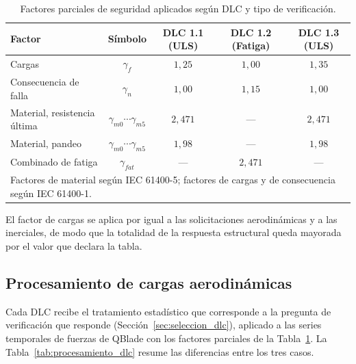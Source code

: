 \begin{table}[H]
    \centering
    \caption{Factores parciales de seguridad aplicados según DLC y tipo de verificación.}
    \label{tab:factores_seguridad}
    \begin{tabular}{lcccc}
        \hline
        \textbf{Factor} & \textbf{Símbolo} & \textbf{DLC 1.1 (ULS)} & \textbf{DLC 1.2 (Fatiga)} & \textbf{DLC 1.3 (ULS)} \\
        \hline
        Cargas & $\gamma_f$ & $1{,}25$ & $1{,}00$ & $1{,}35$ \\
        Consecuencia de falla & $\gamma_n$ & $1{,}00$ & $1{,}15$ & $1{,}00$ \\
        Material, resistencia última & $\gamma_{m0} \cdots \gamma_{m5}$ & $2{,}471$ & — & $2{,}471$ \\
        Material, pandeo & $\gamma_{m0} \cdots \gamma_{m5}$ & $1{,}98$ & — & $1{,}98$ \\
        Combinado de fatiga & $\gamma_{fat}$ & — & $2{,}471$ & — \\
        \hline
        \multicolumn{5}{l}{\footnotesize Factores de material según IEC 61400-5; factores de cargas y de consecuencia según IEC 61400-1.}\\
    \end{tabular}
\end{table}

El factor de cargas se aplica por igual a las solicitaciones aerodinámicas y a las inerciales, de modo que la totalidad de la respuesta estructural queda mayorada por el valor que declara la tabla.

\subsection{Procesamiento de cargas aerodinámicas}
\label{sec:procesamiento_cargas}

Cada DLC recibe el tratamiento estadístico que corresponde a la pregunta de verificación que responde (Sección~\ref{sec:seleccion_dlc}), aplicado a las series temporales de fuerzas de QBlade con los factores parciales de la Tabla~\ref{tab:factores_seguridad}. La Tabla~\ref{tab:procesamiento_dlc} resume las diferencias entre los tres casos.

